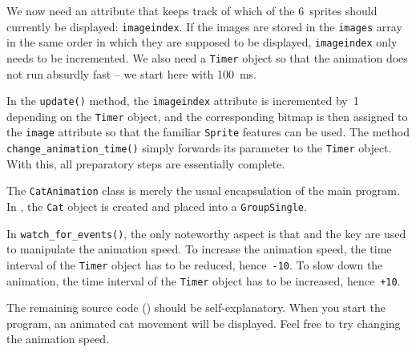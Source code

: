 We now need an attribute that keeps track of which of the 6~sprites should currently be displayed: \texttt{imageindex}. If the images are stored in the \texttt{images} array in the same order in which they are supposed to be displayed, \texttt{imageindex} only needs to be incremented. We also need a \texttt{Timer} object so that the animation does not run absurdly fast -- we start here with \SI{100}{ms}.

In the \texttt{update()} method, the \texttt{imageindex} attribute is incremented by~1 depending on the \texttt{Timer} object, and the corresponding bitmap is then assigned to the \texttt{image} attribute so that the familiar \texttt{Sprite} features can be used. The method \texttt{change\_animation\_time()} simply forwards its parameter to the \texttt{Timer} object. With this, all preparatory steps are essentially complete.


The \texttt{CatAnimation} class is merely the usual encapsulation of the main program. In , the \texttt{Cat} object is created and placed into a \texttt{GroupSingle}.


In \texttt{watch\_for\_events()}, the only noteworthy aspect is that \keys{{+}} and the \keys{-} key are used to manipulate the animation speed. To increase the animation speed, the time interval of the \texttt{Timer} object has to be reduced, hence~\texttt{-10}. To slow down the animation, the time interval of the \texttt{Timer} object has to be increased, hence~\texttt{+10}.


The remaining source code () should be self-explanatory. When you start the program, an animated cat movement will be displayed. Feel free to try changing the animation speed.


